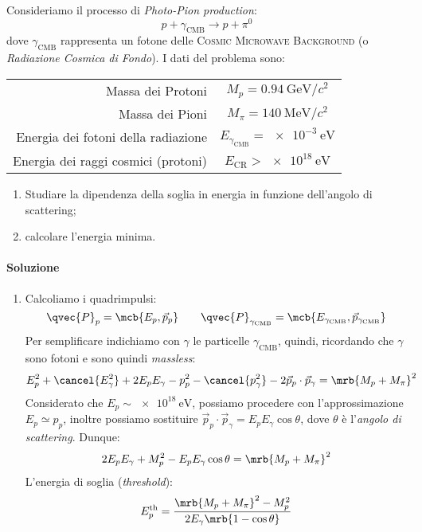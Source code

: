\begin{example}
  Consideriamo il processo di \textit{Photo-Pion production}:
  \[
    p + \gamma _\text{CMB} \rightarrow p + \pi^0
  \]
  dove $\gamma _\text{CMB}$ rappresenta un fotone delle \textsc{Cosmic
  Microwave Background} (o \textit{Radiazione Cosmica di Fondo}).
  I dati del problema sono:
  \begin{table}[h!]
    \centering
    \begin{tabular}{r|c}
      Massa dei Protoni & $M_p = \SI{0.94}{\GeV \per c^2}$
      \\
      Massa dei Pioni & $M _{\pi} = \SI{140}{\MeV \per c^2}$
      \\
      Energia dei fotoni della radiazione & $E _{\gamma _\text{CMB}} =
      \SI{e-3}{\eV}$
      \\
      Energia dei raggi cosmici (protoni) & $E _\text{CR} > \SI{e18}{\eV}$
    \end{tabular}
  \end{table}

  \begin{enumerate}
    \item Studiare la dipendenza della soglia in energia in funzione
      dell'angolo di scattering;
    \item calcolare l'energia minima.
  \end{enumerate}

  \paragraph{Soluzione}
  \begin{enumerate}
    \item Calcoliamo i quadrimpulsi:
      \[
        \qvec{P}_{p} = \mcb{E _{p}, \vec{p}_{p}}
        \qquad
        \qvec{P}_{\gamma _\text{CMB}} = \mcb{E _{\gamma _{\text{CMB}}},
        \vec{p}_{\gamma _\text{CMB}}}
      \]
      Per semplificare indichiamo con $\gamma$ le particelle $\gamma
      _\text{CMB}$, quindi, ricordando che $\gamma$ sono fotoni e sono quindi
      \textit{massless}:
      \[
        E _{p}^{2} + \cancel{E _{\gamma}^{2}} + 2 E _{p} E _{\gamma} - p
        _{p}^{2} - \cancel{p _{\gamma}^{2}} - 2 \vec{p}_{p} \cdot
        \vec{p}_{\gamma} = \mrb{M _{p} + M _{\pi}}^{2}
      \]
      Considerato che $E _{p} \sim \SI{e18}{\eV}$, possiamo procedere con
      l'approssimazione $E _{p} \simeq p _{p}$, inoltre possiamo sostituire
      $\vec{p}_p \cdot \vec{p}_{\gamma} = E _{p} E _{\gamma} \cos \theta$, dove
      $\theta$ è l'\textit{angolo di scattering}. Dunque:
      \[
        2 E_p E _{\gamma} + M _{p}^{2} - E _{p} E _{\gamma} \cos \theta =
        \mrb{M _{p} + M _{\pi}}^{2}
      \]
      L'energia di soglia (\textit{threshold}):
      \[
        E _{p} ^\text{th} = \frac{\mrb{M_p + M _{\pi}}^{2} - M _{p}^{2}}{2 E
        _{\gamma} \mrb{1 - \cos \theta}}
      \]


\end{enumerate}
\end{example}
